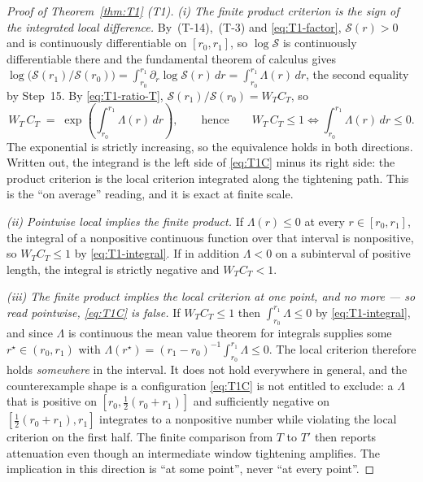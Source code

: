 \begin{proof}[Proof of Theorem~\ref{thm:T1} (T1)]
\emph{(i) The finite product criterion is the sign of the integrated local difference.} By~(T-14),~(T-3)
and \eqref{eq:T1-factor}, $\mathcal S(r) > 0$ and is continuously differentiable on $[r_0,r_1]$, so
$\log\mathcal S$ is continuously differentiable there and the fundamental theorem of calculus gives
$\log\bigl(\mathcal S(r_1)/\mathcal S(r_0)\bigr) = \int_{r_0}^{r_1}\partial_r\log\mathcal S(r)\,dr
= \int_{r_0}^{r_1}\Lambda(r)\,dr$, the second equality by Step~15. By \eqref{eq:T1-ratio-T},
$\mathcal S(r_1)/\mathcal S(r_0) = W_T C_T$, so
\begin{equation}
\label{eq:T1-integral}
W_T\,C_T \;=\; \exp\!\left(\int_{r_0}^{r_1}\Lambda(r)\,dr\right),
\qquad\text{hence}\qquad
W_T\,C_T \le 1 \iff \int_{r_0}^{r_1}\Lambda(r)\,dr \le 0 .
\end{equation}
The exponential is strictly increasing, so the equivalence holds in both directions. Written out,
the integrand is the left side of \eqref{eq:T1C} minus its right side: the product criterion is
the local criterion integrated along the tightening path. This is the ``on average'' reading, and
it is exact at finite scale.

\emph{(ii) Pointwise local implies the finite product.} If $\Lambda(r) \le 0$ at every
$r \in [r_0,r_1]$, the integral of a nonpositive continuous function over that interval is
nonpositive, so $W_T C_T \le 1$ by \eqref{eq:T1-integral}. If in addition $\Lambda < 0$ on a
subinterval of positive length, the integral is strictly negative and $W_T C_T < 1$.

\emph{(iii) The finite product implies the local criterion at one point, and no more --- so read
pointwise, \eqref{eq:T1C} is false.} If $W_T C_T \le 1$ then $\int_{r_0}^{r_1}\Lambda \le 0$ by
\eqref{eq:T1-integral}, and since $\Lambda$ is continuous the mean value theorem for integrals
supplies some $r^\star \in (r_0,r_1)$ with
$\Lambda(r^\star) = (r_1-r_0)^{-1}\int_{r_0}^{r_1}\Lambda \le 0$. The local criterion therefore
holds \emph{somewhere} in the interval. It does not hold everywhere in general, and the
counterexample shape is a configuration \eqref{eq:T1C} is not entitled to exclude: a $\Lambda$ that
is positive on $[r_0,\tfrac12(r_0+r_1)]$ and sufficiently negative on $[\tfrac12(r_0+r_1),r_1]$
integrates to a nonpositive number while violating the local criterion on the first half. The
finite comparison from $T$ to $T'$ then reports attenuation even though an intermediate window
tightening amplifies. The implication in this direction is ``at some point'', never ``at every
point''.


\end{proof}
